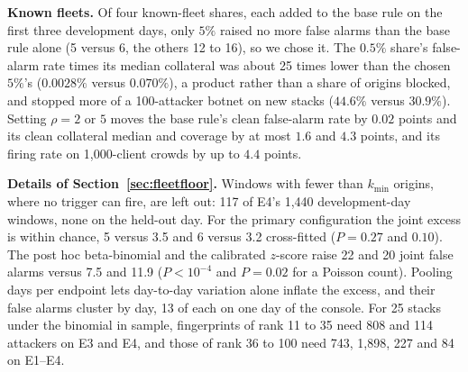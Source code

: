 \documentclass[conference,letterpaper,10pt]{IEEEtran}
\newcommand\1{\textit{(i)}}
\newcommand\2{\textit{(ii)}}
\newcommand\3{\textit{(iii)}}
\newcommand\4{\textit{(iv)}}
\newcommand\5{\textit{(v)}}
\newcommand\6{\textit{(vi)}}
\newcommand\7{\textit{(vii)}}
\newcommand\8{\textit{(viii)}}
\newcommand\9{\textit{(ix)}}
\begin{document}
\textbf{Known fleets.} Of four known-fleet shares, each added to the base rule on the first three development days, only $5\%$ raised no more false alarms than the base rule alone (5 versus 6, the others 12 to 16), so we chose it. The $0.5\%$ share's false-alarm rate times its median collateral was about 25 times lower than the chosen $5\%$'s ($0.0028\%$ versus $0.070\%$), a product rather than a share of origins blocked, and stopped more of a 100-attacker botnet on new stacks ($44.6\%$ versus $30.9\%$). Setting $\rho = 2$ or $5$ moves the base rule's clean false-alarm rate by $0.02$ points and its clean collateral median and coverage by at most $1.6$ and $4.3$ points, and its firing rate on 1,000-client crowds by up to $4.4$ points.

\textbf{Details of Section~\ref{sec:fleetfloor}.} Windows with fewer than $k_{\min}$ origins, where no trigger can fire, are left out: 117 of E4's 1,440 development-day windows, none on the held-out day. For the primary configuration the joint excess is within chance, 5 versus 3.5 and 6 versus 3.2 cross-fitted ($P = 0.27$ and $0.10$). The post hoc beta-binomial and the calibrated $z$-score raise 22 and 20 joint false alarms versus 7.5 and 11.9 ($P < 10^{-4}$ and $P = 0.02$ for a Poisson count). Pooling days per endpoint lets day-to-day variation alone inflate the excess, and their false alarms cluster by day, 13 of each on one day of the console. For 25 stacks under the binomial in sample, fingerprints of rank 11 to 35 need 808 and 114 attackers on E3 and E4, and those of rank 36 to 100 need 743, 1,898, 227 and 84 on E1--E4.
\end{document}
